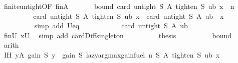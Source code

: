 \begin{isabellebody}
\ finite{\isacharunderscore}{\kern0pt}untight{\isacharbrackleft}{\kern0pt}OF\ finA{\isacharbrackright}{\kern0pt}\ \isakeywordONE{{\isachardot}{\kern0pt}}\isamarkupfalse%
\isanewline
\isanewline
\ \ \ \ \isamarkupfalse%
\ bound{\isacharprime}{\kern0pt}{\isacharcolon}{\kern0pt}\ {\isachardoublequoteopen}card\ {\isacharparenleft}{\kern0pt}untight\ S\ A\ {\isacharparenleft}{\kern0pt}tighten\ S\ ub\ {\isacharquery}{\kern0pt}x{\isacharparenright}{\kern0pt}{\isacharparenright}{\kern0pt}\ {\isasymle}\ n{\isachardoublequoteclose}\isanewline
\ \ \ \ \isamarkupfalse%
\ {\isacharminus}{\kern0pt}\isanewline
\ \ \ \ \ \ \isamarkupfalse%
\ {\isachardoublequoteopen}card\ {\isacharparenleft}{\kern0pt}untight\ S\ A\ {\isacharparenleft}{\kern0pt}tighten\ S\ ub\ {\isacharquery}{\kern0pt}x{\isacharparenright}{\kern0pt}{\isacharparenright}{\kern0pt}\ {\isacharequal}{\kern0pt}\ card\ {\isacharparenleft}{\kern0pt}untight\ S\ A\ ub\ {\isacharminus}{\kern0pt}\ {\isacharbraceleft}{\kern0pt}{\isacharquery}{\kern0pt}x{\isacharbraceright}{\kern0pt}{\isacharparenright}{\kern0pt}{\isachardoublequoteclose}\isanewline
\ \ \ \ \ \ \ \ \isamarkupfalse%
\ {\isacharparenleft}{\kern0pt}simp\ add{\isacharcolon}{\kern0pt}\ Ueq{\isacharparenright}{\kern0pt}\isanewline
\ \ \ \ \ \ \isamarkupfalse%
\ \isamarkupfalse%
\ {\isachardoublequoteopen}{\isasymdots}\ {\isacharequal}{\kern0pt}\ card\ {\isacharparenleft}{\kern0pt}untight\ S\ A\ ub{\isacharparenright}{\kern0pt}\ {\isacharminus}{\kern0pt}\ {}{\isachardoublequoteclose}\isanewline
\ \ \ \ \ \ \ \ \isamarkupfalse%
\ finU\ xU\ \isamarkupfalse%
\ {\isacharparenleft}{\kern0pt}simp\ add{\isacharcolon}{\kern0pt}\ card{\isacharunderscore}{\kern0pt}Diff{\isacharunderscore}{\kern0pt}singleton{\isacharparenright}{\kern0pt}\isanewline
\ \ \ \ \ \ \isamarkupfalse%
\ \isamarkupfalse%
\ {\isacharquery}{\kern0pt}thesis\isanewline
\ \ \ \ \ \ \ \ \isamarkupfalse%
\ bound\ \isamarkupfalse%
\ arith\isanewline
\ \ \ \ \isamarkupfalse%
\isanewline
\isanewline
\ \ \ \ \isamarkupfalse%
\ IH{\isacharcolon}{\kern0pt}\ {\isachardoublequoteopen}{\isasymforall}y{\isasymin}A{\isachardot}{\kern0pt}\ gain\ S\ y\ {\isasymle}\ gain\ S\ {\isacharparenleft}{\kern0pt}lazy{\isacharunderscore}{\kern0pt}argmax{\isacharunderscore}{\kern0pt}gain{\isacharunderscore}{\kern0pt}fuel\ n\ S\ A\ {\isacharparenleft}{\kern0pt}tighten\ S\ ub\ {\isacharquery}{\kern0pt}x{\isacharparenright}{\kern0pt}{\isacharparenright}{\kern0pt}{\isachardoublequoteclose}\isanewline

\end{isabellebody}
